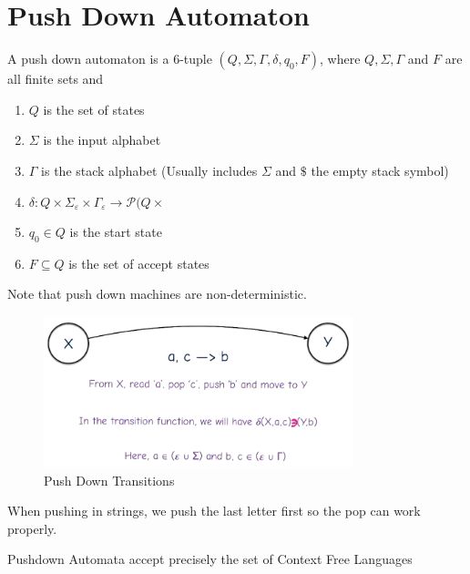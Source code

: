 \documentclass[a4paper]{article}
\theoremstyle{plain}
\newtheorem{thm}{Theorem}[section]
\theoremstyle{definition}
\newtheorem{defn}{Definition}[section]
\theoremstyle{remark}
\begin{document}
\section{Push Down Automaton}
\begin{tcolorbox}[colback=black!3!white,colframe=black!60!white,title=\begin{defn}Push Down Automaton \label{Push Down Automaton}\end{defn}]
A push down automaton is a $6$-tuple $(Q,\Sigma,\Gamma,\delta,q_0,F)$, where $Q,\Sigma,\Gamma$ and $F$ are all finite sets and 
\begin{enumerate}
	\item $Q$ is the set of states
	\item $\Sigma$ is the input alphabet
	\item $\Gamma$ is the stack alphabet (Usually includes $\Sigma$ and $\$$ the empty stack symbol)
	\item $\delta : Q \times \Sigma_{\varepsilon} \times \Gamma_{\varepsilon} \to \mathcal{P}(Q \times $
	\item $q_0 \in Q$ is the start state
	\item $F \subseteq Q$ is the set of accept states
\end{enumerate}
Note that push down machines are non-deterministic.
\end{tcolorbox}
\begin{tcolorbox}[colback=black!3!white,colframe=black!60!white,title=\begin{defn}Transitions in PDM \label{Transitions in PDM}\end{defn}]
\begin{figure}[H]
	\centering
	\includegraphics[width=0.8\textwidth]{fifteen.png}
	\caption{Push Down Transitions}
	\label{fig:fifteen-png}
\end{figure}
When pushing in strings, we push the last letter first so the pop can work properly.
\end{tcolorbox}
\begin{tcolorbox}[colback=black!3!white,colframe=black!60!white,title=\begin{thm}Acceptance \label{Acceptance}\end{thm}]
	Pushdown Automata accept precisely the set of Context Free Languages
\end{tcolorbox}
\end{document}

